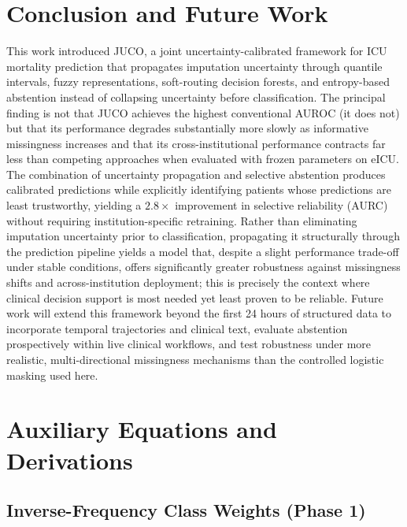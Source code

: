 \documentclass[journal]{IEEEtran}
\begin{document}
	\section{Conclusion and Future Work}
	\label{sec:conclusion}
	
	This work introduced JUCO, a joint uncertainty-calibrated framework for ICU mortality prediction that propagates imputation uncertainty through quantile intervals, fuzzy representations, soft-routing decision forests, and entropy-based abstention instead of collapsing uncertainty before classification. The principal finding is not that JUCO achieves the highest conventional AUROC (it does not) but that its performance degrades substantially more slowly as informative missingness increases and that its cross-institutional performance contracts far less than competing approaches when evaluated with frozen parameters on eICU. The combination of uncertainty propagation and selective abstention produces calibrated predictions while explicitly identifying patients whose predictions are least trustworthy, yielding a $2.8\times$ improvement in selective reliability (AURC) without requiring institution-specific retraining. Rather than eliminating imputation uncertainty prior to classification, propagating it structurally through the prediction pipeline yields a model that, despite a slight performance trade-off under stable conditions, offers significantly greater robustness against missingness shifts and across-institution deployment; this is precisely the context where clinical decision support is most needed yet least proven to be reliable. Future work will extend this framework beyond the first 24 hours of structured data to incorporate temporal trajectories and clinical text, evaluate abstention prospectively within live clinical workflows, and test robustness under more realistic, multi-directional missingness mechanisms than the controlled logistic masking used here.
	
	\appendices
	
	\section{Auxiliary Equations and Derivations}
	\label{app:s1}
	
	\subsection{Inverse-Frequency Class Weights (Phase 1)}
	
\end{document}
